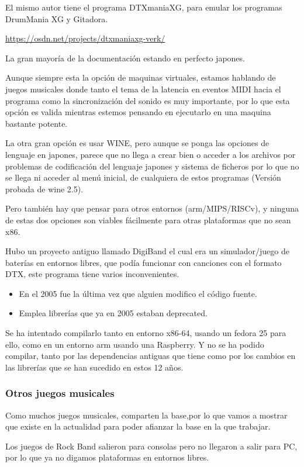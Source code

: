 \documentclass[a4paper,11pt,oneside]{book}
\begin{document}
El mismo autor tiene el programa DTXmaniaXG, para emular los programas DrumMania XG y Gitadora.

\url{https://osdn.net/projects/dtxmaniaxg-verk/}

La gran mayoría de la documentación estando en perfecto japones.

Aunque siempre esta la opción de maquinas virtuales, estamos hablando de juegos musicales donde tanto el tema de la latencia en eventos MIDI hacia el programa como la sincronización del sonido es muy importante, por lo que esta opción es valida mientras estemos pensando en ejecutarlo en una maquina bastante potente.

La otra gran opción es usar WINE, pero aunque se ponga las opciones de lenguaje en japones, parece que no llega a crear bien o acceder a los archivos por problemas de codificación del lenguaje japones y sistema de ficheros por lo que no se llega ni acceder al menú inicial, de cualquiera de estos programas  (Versión probada de wine 2.5).

Pero también hay que pensar para otros entornos (arm/MIPS/RISCv), y ninguna de estas dos opciones son viables fácilmente para otras plataformas que no sean x86.

Hubo un proyecto antiguo llamado DigiBand el cual era un simulador/juego de baterías en entornos libres, que podía funcionar con canciones con el formato DTX, este programa tiene varios inconvenientes.
\begin{itemize}
  \item En el 2005 fue la última vez que alguien modifico el código fuente.
  \item Emplea librerías que ya en 2005 estaban deprecated.
\end{itemize}

Se ha intentado compilarlo tanto en entorno x86-64, usando un fedora 25 para ello, como en un entorno arm usando una Raspberry. Y no se ha podido compilar, tanto por las dependencias antiguas que tiene como por los cambios en las librerías que se han sucedido en estos 12 años.

\subsubsection{Otros juegos musicales}

Como muchos juegos musicales, comparten la base,por lo que vamos a mostrar que existe en la actualidad para poder afianzar la base en la que trabajar.


Los juegos de \gls{Rock Band} salieron para consolas pero no llegaron a salir para PC, por lo que  ya no digamos plataformas en entornos libres.
\end{document}
